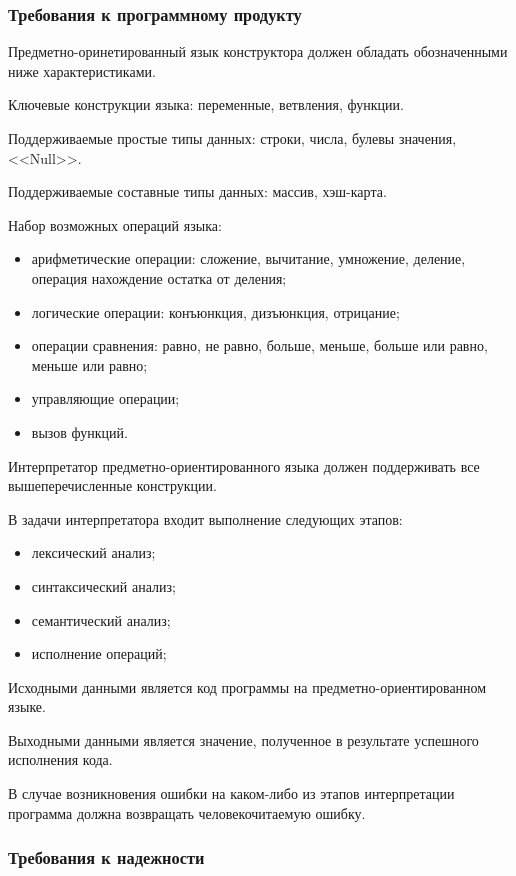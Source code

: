 \subsubsection{Требования к программному продукту}

Предметно-оринетированный язык конструктора должен обладать обозначенными ниже характеристиками.

Ключевые конструкции языка: переменные, ветвления, функции.

Поддерживаемые простые типы данных: строки, числа, булевы значения, <<Null>>.

Поддерживаемые составные типы данных: массив, хэш-карта.

Набор возможных операций языка:
\begin{itemize}
	\item арифметические операции: сложение, вычитание, умножение, деление, операция нахождение остатка от деления;
	\item логические операции: конъюнкция, дизъюнкция, отрицание;
	\item операции сравнения: равно, не равно, больше, меньше, больше или равно, меньше или равно;
	\item управляющие операции;
	\item вызов функций.
\end{itemize}

Интерпретатор предметно-ориентированного языка должен поддерживать все вышеперечисленные конструкции.

В задачи интерпретатора входит выполнение следующих этапов:
\begin{itemize}
	\item лексический анализ;
	\item синтаксический анализ;
	\item семантический анализ;
	\item исполнение операций;
\end{itemize}

Исходными данными является код программы на предметно-ориентированном языке.

Выходными данными является значение, полученное в результате успешного исполнения кода.

В случае возникновения ошибки на каком-либо из этапов интерпретации программа должна возвращать человекочитаемую ошибку.



\subsubsection{Требования к надежности}

